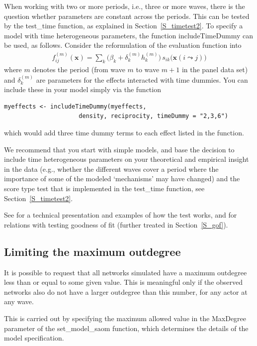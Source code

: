 \documentclass[a4paper,fleqn,11pt]{article}
\newcommand{\+}{\, + \,}
\newcommand{\sfn}[1]{\textsf{#1}}
\begin{document}
When working with two or more periods, i.e., three or more waves,
there is the question whether parameters are constant across the periods.
This can be tested by the \textsf{test\_time} function, as explained
in Section~\ref{S_timetest2}.
To specify a model with time heterogeneous parameters, the function
\sfn{includeTimeDummy} can be used, as follows.
Consider the reformulation of the evaluation function into
\begin{align}
f^{(m)}_{ij}(\mathbf{x})= \sum_k \Big(\beta_k + \delta_k^{(m)} h_k^{(m)}\Big)
                              \,      s_{ik}\big(\mathbf{x}(i \leadsto j)\big)
\label{eq:fmij}
\end{align}
where $m$ denotes the period (from wave $m$ to wave $m+1$
in the panel data set)
and $\delta_k^{(m)}$ are parameters for the effects interacted
with time dummies. You
can include these in your model simply via the function
\begin{verbatim}
myeffects <- includeTimeDummy(myeffects,
                     density, reciprocity, timeDummy = "2,3,6")
\end{verbatim}
which would add three time dummy terms to each effect listed in the function.

We recommend that you start with simple models,
and base the decision to include time heterogeneous parameters
on your theoretical and empirical insight in the data
(e.g., whether the different waves cover a period where the importance
of some of the modeled `mechanisms' may have changed) and
the score type test that is implemented in the \textsf{test\_time} function,
see Section~\ref{S_timetest2}.

See \citet{Lospinoso2011} for a technical presentation
and examples of how the test works,
and \citet{LospinosoSnijders2019} for relations with
testing goodness of fit (further treated in Section~\ref{S_gof}).


\subsection{Limiting the maximum outdegree}
\label{S_maxdegree}

It is possible to request that all networks simulated have a
maximum outdegree less than or equal to some given value.
This is meaningful only if the observed networks also do
not have a larger outdegree than this number, for any actor at any wave.

This is carried out by specifying the maximum allowed value
in the \textsf{MaxDegree} parameter of the \textsf{set\_model\_saom}
function, which determines the details of the model specification.
\end{document}
